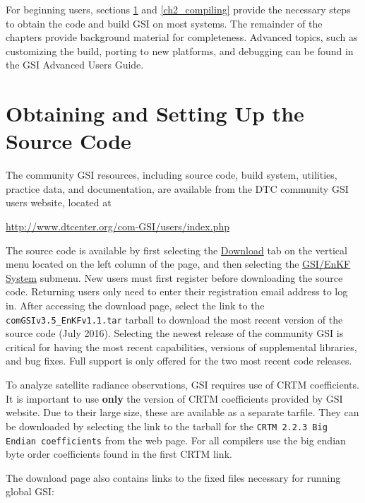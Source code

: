 For beginning users, sections \ref{ch2_obtainingcode} and \ref{ch2_compiling} provide the necessary 
steps to obtain the code and build GSI on most systems. The remainder of the chapters provide 
background material for completeness. 
Advanced topics, such as customizing the build, porting to new platforms, and debugging can be 
found in the GSI Advanced User\textquotesingle s Guide.

\section{Obtaining and Setting Up the Source Code}  \label{ch2_obtainingcode}

The community GSI resources, including source code, build system, utilities, practice data, and 
documentation, are available from the DTC community GSI users website, located at

\url{http://www.dtcenter.org/com-GSI/users/index.php}

The source code is available by first selecting the \underline{Download} tab on the vertical 
menu located on the left column of the page, and then selecting the 
\underline{GSI/EnKF System} 
submenu. New users must first register before downloading the source code. Returning users 
only need to enter their registration email address to log in. After accessing the download page, 
select the link to the \verb|comGSIv3.5_EnKFv1.1.tar| tarball to download the most recent version 
of the source code (July 2016). Selecting the newest release of the community GSI is critical for 
having the most recent capabilities, versions of supplemental libraries, and bug fixes. Full support 
is only offered for the two most recent code releases.

To analyze satellite radiance observations, GSI requires use of CRTM coefficients. It is important to
use \textbf{only} the version of CRTM coefficients provided by GSI website. Due to their large size, 
these are available as a separate tarfile. They can be downloaded by selecting the link to the 
tarball for the \verb|CRTM 2.2.3 Big Endian coefficients| from the web page. For all compilers 
use the big endian byte order coefficients found in the first CRTM link.

The download page also contains links to the fixed files necessary for 
running global GSI:

